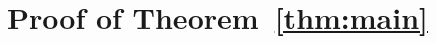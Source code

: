 \documentclass{amsart}
\begin{document}

\section{Proof of Theorem~\ref{thm:main}}\label{Proof of main}
\end{document}
